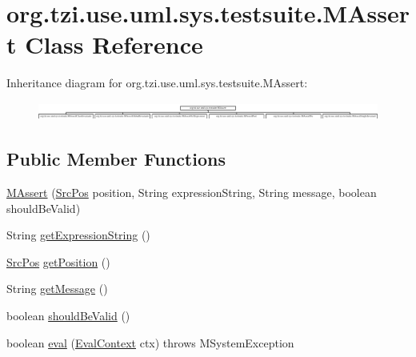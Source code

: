 \hypertarget{classorg_1_1tzi_1_1use_1_1uml_1_1sys_1_1testsuite_1_1_m_assert}{\section{org.\-tzi.\-use.\-uml.\-sys.\-testsuite.\-M\-Assert Class Reference}
\label{classorg_1_1tzi_1_1use_1_1uml_1_1sys_1_1testsuite_1_1_m_assert}
}
Inheritance diagram for org.\-tzi.\-use.\-uml.\-sys.\-testsuite.\-M\-Assert\-:\begin{figure}[H]
\begin{center}
\leavevmode
\includegraphics[height=0.590717cm]{classorg_1_1tzi_1_1use_1_1uml_1_1sys_1_1testsuite_1_1_m_assert}
\end{center}
\end{figure}
\subsection*{Public Member Functions}
\begin{DoxyCompactItemize}
\item 
\hyperlink{classorg_1_1tzi_1_1use_1_1uml_1_1sys_1_1testsuite_1_1_m_assert_a45f32748f7dd3f939442027409da5930}{M\-Assert} (\hyperlink{classorg_1_1tzi_1_1use_1_1parser_1_1_src_pos}{Src\-Pos} position, String expression\-String, String message, boolean should\-Be\-Valid)
\item 
String \hyperlink{classorg_1_1tzi_1_1use_1_1uml_1_1sys_1_1testsuite_1_1_m_assert_a3048b59f0d3df02544aefdd21037263d}{get\-Expression\-String} ()
\item 
\hyperlink{classorg_1_1tzi_1_1use_1_1parser_1_1_src_pos}{Src\-Pos} \hyperlink{classorg_1_1tzi_1_1use_1_1uml_1_1sys_1_1testsuite_1_1_m_assert_a1ef3167aa4aed994e56f77721556c622}{get\-Position} ()
\item 
String \hyperlink{classorg_1_1tzi_1_1use_1_1uml_1_1sys_1_1testsuite_1_1_m_assert_a61e9265b7a1bf750fb477e42019edead}{get\-Message} ()
\item 
boolean \hyperlink{classorg_1_1tzi_1_1use_1_1uml_1_1sys_1_1testsuite_1_1_m_assert_ae03576542768bccfc424b29ad2cfe57d}{should\-Be\-Valid} ()
\item 
boolean \hyperlink{classorg_1_1tzi_1_1use_1_1uml_1_1sys_1_1testsuite_1_1_m_assert_ac0e313477f68570f944dc755fb5b2019}{eval} (\hyperlink{classorg_1_1tzi_1_1use_1_1uml_1_1ocl_1_1expr_1_1_eval_context}{Eval\-Context} ctx)  throws M\-System\-Exception 
\end{DoxyCompactItemize}
